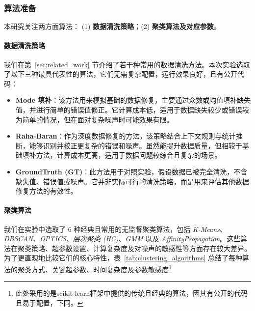 \documentclass[10pt]{article} %
\numberwithin{equation}{section}
\begin{document}
\noindent
\vspace{-20pt} %

\subsubsection{算法准备}
\label{sec:algo_prep}

本研究关注两方面算法：
(1) \textbf{数据清洗策略}；(2) \textbf{聚类算法及对应参数}。

\paragraph{数据清洗策略}
我们在第~\ref{sec:related_work} 节介绍了若干种常用的数据清洗方法。本次实验选取了以下三种最具代表性的算法，它们无需复杂配置，运行效果良好，且有公开代码：
\begin{itemize}
	\item \textbf{Mode 填补}：该方法用来模拟基础的数据修复，主要通过众数或均值填补缺失值，并进行简单的错误值修正。它计算成本低，适用于数据缺失较少或错误较为简单的情况，但在面对复杂噪声时可能效果有限。
	\item \textbf{Raha-Baran}：作为深度数据修复的方法，该策略结合上下文规则与统计推断，能够识别并校正更复杂的错误和噪声。虽然能提升数据质量，但相较于基础填补方法，计算成本更高，适用于数据问题较综合且复杂的场景。
	\item \textbf{GroundTruth (GT)}：此方法用于对照实验\cite{Abdelaal2023}，假设数据已被完全清洗，不含缺失值、错误值或噪声。它并非实际可行的清洗策略，而是用来评估其他数据修复方法的有效性。

\end{itemize}

\paragraph{聚类算法}
我们在实验中选取了 6 种经典且常用的无监督聚类算法，包括 \textit{K-Means}、\textit{DBSCAN}、\textit{OPTICS}、\textit{层次聚类 (HC)}、\textit{GMM} 以及 \textit{AffinityPropagation}。这些算法在聚类策略、超参数设置、计算复杂度及对噪声的敏感性等方面存在较大差异。为了更直观地比较它们的核心特性，表~\ref{tab:clustering_algorithms} 总结了每种算法的聚类方式、关键超参数、时间复杂度及参数敏感度\footnote{此处采用的是scikit-learn\cite{10.5555/1953048.2078195}框架中提供的传统且经典的算法，因其有公开的代码且易于配置，下同。}
\end{document}
